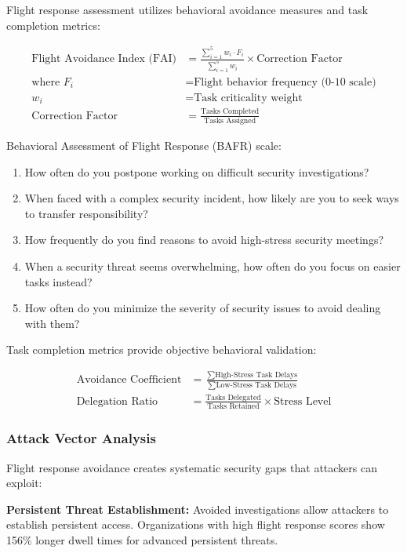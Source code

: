\documentclass[11pt,a4paper]{article}
\begin{document}
Flight response assessment utilizes behavioral avoidance measures and task completion metrics:

\begin{align}
\text{Flight Avoidance Index (FAI)} &= \frac{\sum_{i=1}^{5} w_i \cdot F_i}{\sum_{i=1}^{5} w_i} \times \text{Correction Factor} \\
\text{where } F_i &= \text{Flight behavior frequency (0-10 scale)} \\
w_i &= \text{Task criticality weight} \\
\text{Correction Factor} &= \frac{\text{Tasks Completed}}{\text{Tasks Assigned}}
\end{align}

Behavioral Assessment of Flight Response (BAFR) scale:

\begin{enumerate}
\item How often do you postpone working on difficult security investigations?
\item When faced with a complex security incident, how likely are you to seek ways to transfer responsibility?
\item How frequently do you find reasons to avoid high-stress security meetings?
\item When a security threat seems overwhelming, how often do you focus on easier tasks instead?
\item How often do you minimize the severity of security issues to avoid dealing with them?
\end{enumerate}

Task completion metrics provide objective behavioral validation:

\begin{align}
\text{Avoidance Coefficient} &= \frac{\sum \text{High-Stress Task Delays}}{\sum \text{Low-Stress Task Delays}} \\
\text{Delegation Ratio} &= \frac{\text{Tasks Delegated}}{\text{Tasks Retained}} \times \text{Stress Level}
\end{align}

\subsubsection{Attack Vector Analysis}

Flight response avoidance creates systematic security gaps that attackers can exploit:

\textbf{Persistent Threat Establishment:} Avoided investigations allow attackers to establish persistent access. Organizations with high flight response scores show 156\% longer dwell times for advanced persistent threats\cite{persistence2022}.
\end{document}
